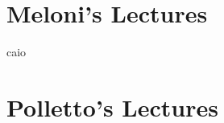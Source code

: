 \documentclass[11pt, a4paper, twoside, openright]{book}
\begin{document}
%
%
%
%
%
%






\mainmatter
\pagestyle{fancy}

\part{Meloni's Lectures}



 
 
 

caio

\part{Polletto's Lectures}

\backmatter
\pagestyle{plain}



\end{document}
